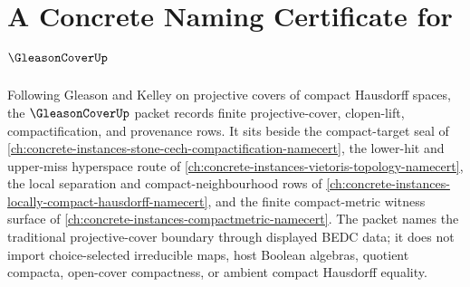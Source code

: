 \chapter{A Concrete Naming Certificate for $\GleasonCoverUp$}
\label{ch:concrete-instances-gleason-cover-namecert}

Following Gleason and Kelley on projective covers of compact Hausdorff spaces, the $\GleasonCoverUp$ packet records finite projective-cover, clopen-lift, compactification, and provenance rows. It sits beside the compact-target seal of \autoref{ch:concrete-instances-stone-cech-compactification-namecert}, the lower-hit and upper-miss hyperspace route of \autoref{ch:concrete-instances-vietoris-topology-namecert}, the local separation and compact-neighbourhood rows of \autoref{ch:concrete-instances-locally-compact-hausdorff-namecert}, and the finite compact-metric witness surface of \autoref{ch:concrete-instances-compactmetric-namecert}. The packet names the traditional projective-cover boundary through displayed BEDC data; it does not import choice-selected irreducible maps, host Boolean algebras, quotient compacta, open-cover compactness, or ambient compact Hausdorff equality.

